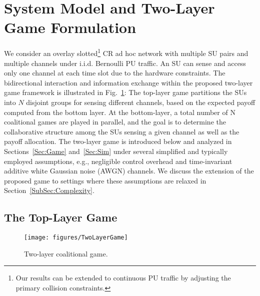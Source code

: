 \documentclass[journal,draftclsnofoot,onecolumn]{IEEEtran}
\theoremstyle{definition}
\def\FigScaleS{0.4}
\def\FigScaleS{0.45}
\begin{document}
\section{System Model and Two-Layer Game Formulation}\label{Sec:Model}
We consider an overlay slotted\footnote{\label{Note:continuousPUtraffic}Our results can be extended to continuous PU traffic by adjusting the primary collision constraints\cite{JWangChSelSurvey}.} CR ad hoc network with multiple SU pairs and multiple channels under i.i.d. Bernoulli PU traffic. An SU can sense and access only one channel at each time slot due to the hardware constraints. The bidirectional interaction and information exchange within the proposed two-layer game framework is illustrated in Fig.~\ref{Fig:TwoLayerGame}: The top-layer game partitions the SUs into $N$ disjoint groups for sensing different channels, based on the expected payoff computed from the bottom layer. At the bottom-layer, a total number of N coalitional games are played in parallel, and the goal is to determine the collaborative structure among the SUs sensing a given channel as well as the payoff allocation. The two-layer game is introduced below and analyzed in Sections~\ref{Sec:Game} and~\ref{Sec:Sim} under several simplified and typically employed assumptions, e.g., negligible control overhead and time-invariant additive white Gaussian noise (AWGN) channels. We discuss the extension of the proposed game to settings where these assumptions are relaxed in Section~\ref{SubSec:Complexity}.
\subsection{The Top-Layer Game}\label{SubSec:TopDef}
\begin{figure}[!t]
    \centering
    \texttt{[image: figures/TwoLayerGame]}
    \caption{Two-layer coalitional game.}
    \label{Fig:TwoLayerGame}
\end{figure}
\end{document}
